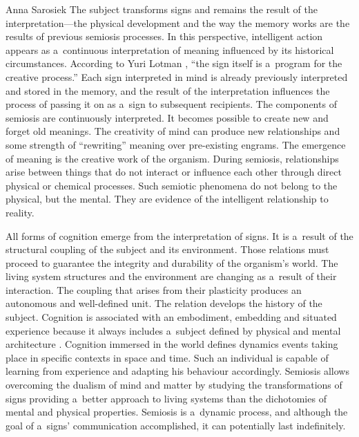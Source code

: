 \begin{artengenv}{Anna Sarosiek}
The subject transforms signs and remains the result of the interpretation---the physical development and the way the memory works are the results of previous semiosis processes. In this perspective, intelligent action appears as a~continuous interpretation of meaning influenced by its historical circumstances. According to Yuri Lotman
\parencite*[][p.101]{lotman_universe_1990}, %
 ``the sign itself is a~program for the creative process.'' Each sign interpreted in mind is already previously interpreted and stored in the memory, and the result of the interpretation influences the process of passing it on as a~sign to subsequent recipients. The components of semiosis are continuously interpreted. It becomes possible to create new and forget old meanings. The creativity of mind can produce new relationships and some strength of ``rewriting'' meaning over pre-existing engrams. The emergence of meaning is the creative work of the organism. During semiosis, relationships arise between things that do not interact or influence each other through direct physical or chemical processes. Such semiotic phenomena do not belong to the physical, but the mental. They are evidence of the intelligent relationship to reality.

All forms of cognition emerge from the interpretation of signs. It is a~result of the structural coupling of the subject and its environment. Those relations must proceed to guarantee the integrity and durability of the organism’s world. The living system structures and the environment are changing as a~result of their interaction. The coupling that arises from their plasticity produces an autonomous and well-defined unit. The relation develops the history of the subject. Cognition is associated with an embodiment, embedding and situated experience because it always includes a~subject defined by physical and mental architecture
\parencites[][]{wilson_embodied_2013}[][]{lakoff_metaphors_2008}[][]{miles_moving_2010}. %
 Cognition immersed in the world defines dynamics events taking place in specific contexts in space and time. Such an individual is capable of learning from experience and adapting his behaviour accordingly. Semiosis allows overcoming the dualism of mind and matter by studying the transformations of signs providing a~better approach to living systems than the dichotomies of mental and physical properties. Semiosis is a~dynamic process, and although the goal of a~signs’ communication accomplished, it can potentially last indefinitely.


\end{artengenv}
